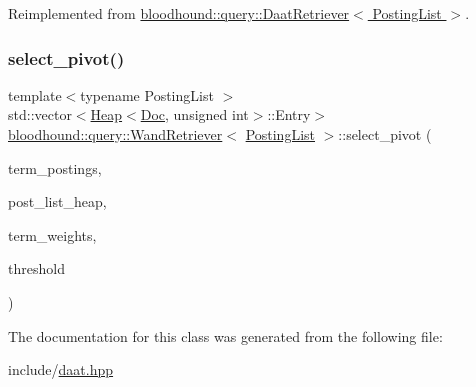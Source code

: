 Reimplemented from \hyperlink{classbloodhound_1_1query_1_1DaatRetriever_ab80b4867fc263827dc2fdbe0965a2e8c}{bloodhound\+::query\+::\+Daat\+Retriever$<$ Posting\+List $>$}.

\mbox{\label{classbloodhound_1_1query_1_1WandRetriever_a8cf0de41f414aed6e00c28f808faddf6}} 
\subsubsection{\texorpdfstring{select\+\_\+pivot()}{select\_pivot()}}
{\footnotesize\ttfamily template$<$typename Posting\+List $>$ \\
std\+::vector$<$\hyperlink{classbloodhound_1_1Heap}{Heap}$<$\hyperlink{structbloodhound_1_1Doc}{Doc}, unsigned int$>$\+::Entry$>$ \hyperlink{classbloodhound_1_1query_1_1WandRetriever}{bloodhound\+::query\+::\+Wand\+Retriever}$<$ \hyperlink{classbloodhound_1_1PostingList}{Posting\+List} $>$\+::select\+\_\+pivot (\begin{DoxyParamCaption}\item[{const std\+::vector$<$ \hyperlink{classbloodhound_1_1PostingList}{Posting\+List} $>$ \&}]{term\+\_\+postings,  }\item[{\hyperlink{classbloodhound_1_1Heap}{Heap}$<$ \hyperlink{structbloodhound_1_1Doc}{Doc}, unsigned int $>$ \&}]{post\+\_\+list\+\_\+heap,  }\item[{const std\+::vector$<$ \hyperlink{structbloodhound_1_1Score}{Score} $>$ \&}]{term\+\_\+weights,  }\item[{const \hyperlink{structbloodhound_1_1Score}{Score}}]{threshold }\end{DoxyParamCaption})\hspace{0.3cm}{\ttfamily [inline]}}



The documentation for this class was generated from the following file\+:\begin{DoxyCompactItemize}
\item 
include/\hyperlink{daat_8hpp}{daat.\+hpp}\end{DoxyCompactItemize}
